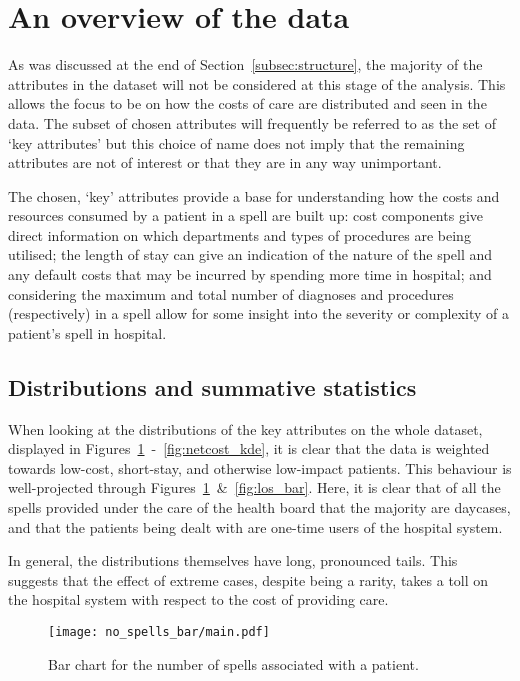 \section{An overview of the data}\label{sec:overview}

As was discussed at the end of Section~\ref{subsec:structure}, the majority of
the attributes in the dataset will not be considered at this stage of the
analysis. This allows the focus to be on how the costs of care are distributed
and seen in the data. The subset of chosen attributes will frequently be
referred to as the set of `key attributes' but this choice of name does not
imply that the remaining attributes are not of interest or that they are in any
way unimportant.

The chosen, `key' attributes provide a base for understanding how the
costs and resources consumed by a patient in a spell are built up: cost
components give direct information on which departments and types of procedures
are being utilised; the length of stay can give an indication of the nature of
the spell and any default costs that may be incurred by spending more time in
hospital; and considering the maximum and total number of diagnoses and
procedures (respectively) in a spell allow for some insight into the severity or
complexity of a patient's spell in hospital.

\subsection{Distributions and summative statistics}%
\label{subsec:distributions_statistics}

When looking at the distributions of the key attributes on the whole dataset,
displayed in Figures~\ref{fig:no_spells_bar}~\--~\ref{fig:netcost_kde}, it
is clear that the data is weighted towards low-cost, short-stay, and
otherwise low-impact patients. This behaviour is well-projected through
Figures~\ref{fig:no_spells_bar}~\&~\ref{fig:los_bar}. Here, it is clear that of
all the spells provided under the care of the health board that the majority are
daycases, and that the patients being dealt with are one-time users of the
hospital system.

In general, the distributions themselves have long, pronounced tails. This
suggests that the effect of extreme cases, despite being a rarity, takes a toll
on the hospital system with respect to the cost of providing care.

\begin{figure}[htbp]
    \centering
    \texttt{[image: no\_spells\_bar/main.pdf]}
    \caption{Bar chart for the number of spells associated with a patient.}%
    \label{fig:no_spells_bar}
\end{figure}

